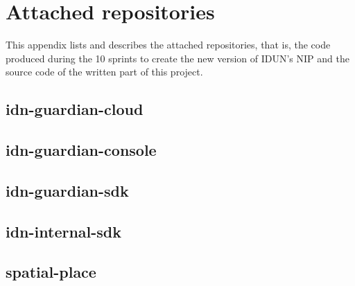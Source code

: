 \chapter{Attached repositories}
\label{appendix6-attached-repositories}

This appendix lists and describes the attached repositories, that is, the code produced during the 10 sprints to create the new version of IDUN’s NIP and the source code of the written part of this project.

\section*{idn-guardian-cloud}

\section*{idn-guardian-console}

\section*{idn-guardian-sdk}

\section*{idn-internal-sdk}

\section*{spatial-place}
